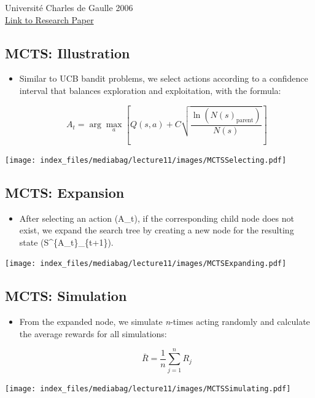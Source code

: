 \documentclass[
  letterpaper,
  DIV=11,
  numbers=noendperiod]{scrreprt}
\providecommand{\tightlist}{%
  \setlength{\itemsep}{0pt}\setlength{\parskip}{0pt}}\usepackage{longtable,booktabs,array}
\begin{document}
Université Charles de Gaulle 2006\\
\href{https://inria.hal.science/inria-00116992/document}{Link to
Research Paper}

\subsection{MCTS: Illustration}\label{mcts-illustration}

\begin{itemize}
\item
  Similar to UCB bandit problems, we select actions according to a
  confidence interval that balances exploration and exploitation, with
  the formula:

  \[A_t = \arg\max_a \left[ Q(s,a) + C \sqrt{\frac{\ln(N(s)_{\text{parent}})}{N(s)}} \right]\]
\end{itemize}

\texttt{[image: index\_files/mediabag/lecture11/images/MCTSSelecting.pdf]}

\subsection{MCTS: Expansion}\label{mcts-expansion}

\begin{itemize}
\tightlist
\item
  After selecting an action (A\_t), if the corresponding child node does
  not exist, we expand the search tree by creating a new node for the
  resulting state (S\^{}\{A\_t\}\_\{t+1\}).
\end{itemize}

\texttt{[image: index\_files/mediabag/lecture11/images/MCTSExpanding.pdf]}

\subsection{MCTS: Simulation}\label{mcts-simulation}

\begin{itemize}
\item
  From the expanded node, we simulate \emph{n}-times acting randomly and
  calculate the average rewards for all simulations:

  \[\bar{R} = \frac{1}{n} \sum_{j=1}^{n} R_j\]
\end{itemize}

\texttt{[image: index\_files/mediabag/lecture11/images/MCTSSimulating.pdf]}
\end{document}
